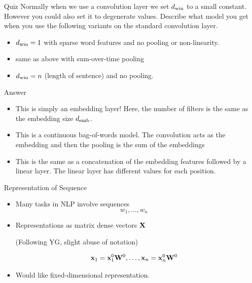 \documentclass{beamer}
\begin{document}
\begin{frame}{Quiz}
  Normally when we use a convolution layer we set ${d_{\mathrm{win}}}$ to a small
  constant. However you could also set it to degenerate values.
  Describe what model you get when you use the following variants on
  the standard convolution layer. 

  \begin{itemize}

  \item ${d_{\mathrm{win}}}=1$ with sparse word features and no pooling or non-linearity. 
    \air 

  \item same as above with sum-over-time pooling
    \air 
  \item ${d_{\mathrm{win}}}=n$ (length of sentence) and no pooling. 
  \end{itemize}

\end{frame}

\begin{frame}{Answer}

  \begin{itemize}
  \item This is simply an embedding layer! Here, the number of filters 
    is the same as the embedding size ${d_{\mathrm{emb}}}$.
    \air

  \item This is a continuous bag-of-words model. The convolution 
    acts as the embedding and then the pooling is the sum of the embeddings
    \air 

  \item This is the same as a concatenation of the embedding features followed 
    by a linear layer. The linear layer has different values for each position.
 
  \end{itemize}
  
\end{frame}



\begin{frame}{Representation of Sequence}
  \begin{itemize}
  \item   Many tasks in NLP involve sequences
  \[w_1, \ldots, w_n\] 

  \air
   \item Representations as matrix dense vectors $\mathbf{X}$ 

  (Following YG, slight abuse of notation)

  \[\mathbf{x}_1 =  \mathbf{x}^0_1 \mathbf{W}^0, \ldots, \mathbf{x}_n =\mathbf{x}^0_n \mathbf{W}^0 \]

  \item Would like fixed-dimensional representation.
  
  \end{itemize}
\end{frame}
\end{document}
